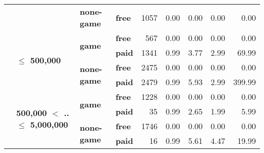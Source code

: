 \begin{tabular}{llll|rrrrr}
\cline{3-9}
      &                                 & \textbf{none-game} & \textbf{free} &   1057 &         0.00 &         0.00 &         0.00 &          0.00 \\
\cline{2-9}
      & \multirow{4}{*}{\textbf{$\leq$ 500,000}} & \multirow{2}{*}{\textbf{game}} & \textbf{free} &    567 &         0.00 &         0.00 &         0.00 &          0.00 \\
      &                                 &           & \textbf{paid} &   1341 &         0.99 &         3.77 &         2.99 &         69.99 \\
\cline{3-9}
      &                                 & \multirow{2}{*}{\textbf{none-game}} & \textbf{free} &   2475 &         0.00 &         0.00 &         0.00 &          0.00 \\
      &                                 &           & \textbf{paid} &   2479 &         0.99 &         5.93 &         2.99 &        399.99 \\
\cline{2-9}
\cline{3-9}
      & \multirow{4}{*}{\textbf{500,000 $<$ .. $\leq$ 5,000,000}} & \multirow{2}{*}{\textbf{game}} & \textbf{free} &   1228 &         0.00 &         0.00 &         0.00 &          0.00 \\
      &                                 &           & \textbf{paid} &     35 &         0.99 &         2.65 &         1.99 &          5.99 \\
\cline{3-9}
      &                                 & \multirow{2}{*}{\textbf{none-game}} & \textbf{free} &   1746 &         0.00 &         0.00 &         0.00 &          0.00 \\
      &                                 &           & \textbf{paid} &     16 &         0.99 &         5.61 &         4.47 &         19.99 \\
\bottomrule
\end{tabular}
